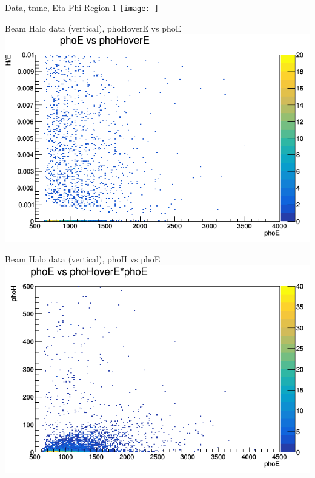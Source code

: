 \documentclass{beamer}
\begin{document}
\begin{frame}{Data, tmne, Eta-Phi Region 1}
    \texttt{[image: ]}
\end{frame}
\begin{frame}{Beam Halo data (vertical), phoHoverE vs phoE}
    \includegraphics[width=\linewidth]{phoE_vs_phoHoverE_anTGCtree_data_bhvertical.png}
\end{frame}
\begin{frame}{Beam Halo data (vertical), phoH vs phoE}
    \includegraphics[width=\linewidth]{phoE_vs_phoH_anTGCtree_data_bhvertical.png}
\end{frame}
\end{document}
